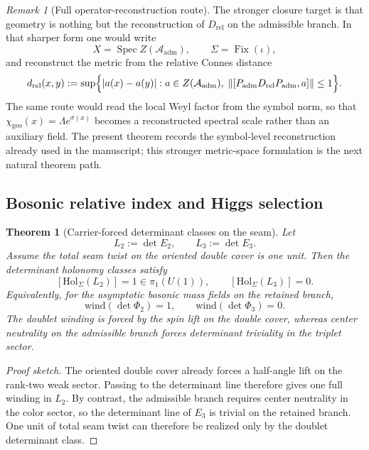 \documentclass[11pt,a4paper]{article}
\newtheorem{theorem}{Theorem}[section]
\theoremstyle{definition}
\theoremstyle{remark}
\newtheorem*{remark}{Remark}
\newcommand{\Seam}{\Sigma}
\newcommand{\inv}{\iota}
\newcommand{\chigeo}{\chi_{\mathrm{geo}}}
\newcommand{\Padm}{P_{\mathrm{adm}}}
\begin{document}
\begin{remark}[Full operator-reconstruction route]
The stronger closure target is that geometry is nothing but the reconstruction of
$D_{\mathrm{rel}}$ on the admissible branch. In that sharper form one would write
\[
X=\operatorname{Spec} Z(\mathcal A_{\mathrm{adm}}),
\qquad
\Seam=\operatorname{Fix}(\inv),
\]
and reconstruct the metric from the relative Connes distance
\[
d_{\mathrm{rel}}(x,y)
:=
\sup\Bigl\{
|a(x)-a(y)|:
a\in Z(\mathcal A_{\mathrm{adm}}),\;
\|[\Padm D_{\mathrm{rel}}\Padm,a]\|\le 1
\Bigr\}.
\]
The same route would read the local Weyl factor from the symbol norm, so that
$\chigeo(x)=\Lambda e^{\sigma(x)}$ becomes a reconstructed spectral scale rather than
an auxiliary field. The present theorem records the symbol-level reconstruction
already used in the manuscript; this stronger metric-space formulation is the
next natural theorem path.
\end{remark}

\subsection{Bosonic relative index and Higgs selection}

\begin{theorem}[Carrier-forced determinant classes on the seam]
\label{thm:determinant-class-higgs-selection}
Let
\[
L_2:=\det E_2,
\qquad
L_3:=\det E_3.
\]
Assume the total seam twist on the oriented double cover is one unit. Then the determinant holonomy classes satisfy
\[
[\mathrm{Hol}_\Sigma(L_2)]=1\in\pi_1(U(1)),
\qquad
[\mathrm{Hol}_\Sigma(L_3)]=0.
\]
Equivalently, for the asymptotic bosonic mass fields on the retained branch,
\[
\mathrm{wind}(\det\Phi_2)=1,
\qquad
\mathrm{wind}(\det\Phi_3)=0.
\]
The doublet winding is forced by the spin lift on the double cover, whereas center neutrality on the admissible branch forces determinant triviality in the triplet sector.
\end{theorem}

\begin{proof}[Proof sketch]
The oriented double cover already forces a half-angle lift on the rank-two weak sector. Passing to the determinant line therefore gives one full winding in $L_2$. By contrast, the admissible branch requires center neutrality in the color sector, so the determinant line of $E_3$ is trivial on the retained branch. One unit of total seam twist can therefore be realized only by the doublet determinant class.
\end{proof}
\end{document}

